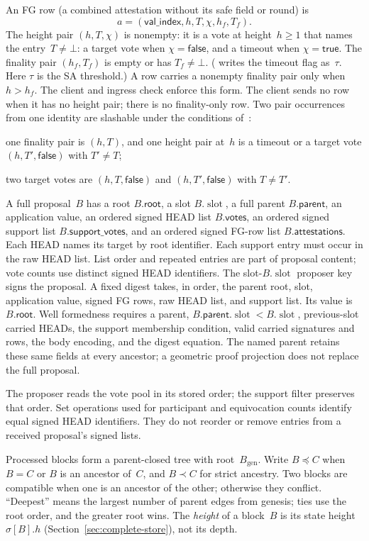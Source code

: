 \documentclass{article}
\theoremstyle{plain}
\theoremstyle{definition}
\theoremstyle{remark}
\newcommand{\genesis}{B_{\mathrm{gen}}}
\newcommand{\slot}{\operatorname{slot}}
\newcommand{\parent}{\mathsf{parent}}
\newcommand{\rootf}{\mathsf{root}}
\newcommand{\votesf}{\mathsf{votes}}
\newcommand{\supportf}{\mathsf{support\_votes}}
\newcommand{\attsf}{\mathsf{attestations}}
\newcommand{\valindex}{\mathsf{val\_index}}
\newcommand{\DC}[1]{\cite[\S#1]{DC}}
\begin{document}
An FG row (a combined attestation without its safe field or round) is
\[
 a=(\valindex,h,T,\chi,h_f,T_f).
\]
The height pair $(h,T,\chi)$ is nonempty: it is a vote at
height~$h\geq1$ that names the entry~$T\neq\bot$: a target vote when
$\chi=\mathsf{false}$, and a timeout when $\chi=\mathsf{true}$.  The
finality pair $(h_f,T_f)$ is empty or has $T_f\neq\bot$.  (\cite{DC}
writes the timeout flag as~$\tau$.  Here $\tau$ is the SA threshold.)
A row carries a nonempty finality pair only when $h>h_f$.
The client and ingress check enforce this form.
The client sends no row when it has no height pair; there is no
finality-only row.
Two pair occurrences from one identity are slashable under the
conditions of~\DC{4}:
\begin{description}[nosep]
 \item[E1:] one finality pair is $(h,T)$, and one height pair at~$h$ is a
   timeout or a target vote $(h,T',\mathsf{false})$ with $T'\neq T$;
 \item[E2:] two target votes are $(h,T,\mathsf{false})$ and
   $(h,T',\mathsf{false})$ with $T\neq T'$.
\end{description}

A full proposal~$B$ has a root $B.\rootf$, a slot $B.\slot$, a full parent
$B.\parent$, an application value, an ordered signed HEAD list $B.\votesf$,
an ordered signed support list $B.\supportf$, and an ordered signed FG-row
list $B.\attsf$. Each HEAD names its target by root identifier. Each support
entry must occur in the raw HEAD list. List order and repeated entries are
part of proposal content; vote counts use distinct signed HEAD identifiers.
The slot-$B.\slot$ proposer key signs the proposal. A fixed digest takes,
in order, the parent root, slot, application value, signed FG rows, raw HEAD
list, and support list. Its value is $B.\rootf$. Well formedness requires a
parent, $B.\parent.\slot<B.\slot$, previous-slot carried HEADs, the support
membership condition, valid carried signatures and rows, the body encoding,
and the digest equation. The named parent retains these same fields at every
ancestor; a geometric proof projection does not replace the full proposal.

The proposer reads the vote pool in its stored order; the support filter
preserves that order. Set operations used for participant and equivocation
counts identify equal signed HEAD identifiers. They do not reorder or remove
entries from a received proposal's signed lists.

Processed blocks form a parent-closed tree with root~$\genesis$.  Write
$B\preceq C$ when $B=C$ or $B$ is an ancestor of~$C$, and $B\prec C$
for strict ancestry.  Two blocks are compatible when one is an ancestor
of the other; otherwise they conflict.  ``Deepest'' means the largest
number of parent edges from genesis; ties use the root order, and the
greater root wins.  The \emph{height} of a block~$B$ is its state height
$\sigma[B].h$ (Section~\ref{sec:complete-store}), not its depth.
\end{document}
